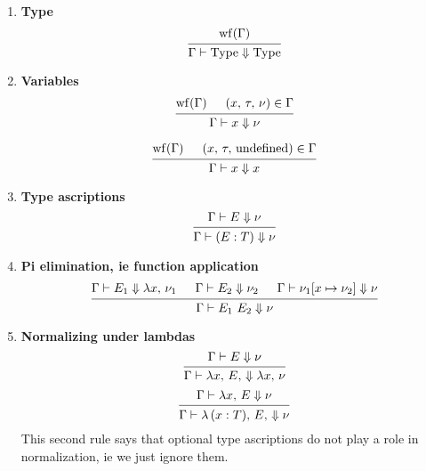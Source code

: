 \documentclass{article}
\begin{document}
\begin{enumerate}
\item \textbf{Type}
  \[
    \begin{prooftree}
      \hypo{\wf(\Gamma)}
      \infer1{\Gamma \vdash \Type \Downarrow \Type} 
    \end{prooftree}
  \]
\item \textbf{Variables} \\
  \[
    \begin{prooftree}
      \hypo{\wf(\Gamma)}
      \hypo{(x, \, \tau, \, \nu) \in \Gamma}
      \infer2{\Gamma \vdash x \Downarrow \nu}
    \end{prooftree} 
  \]

  \[
    \begin{prooftree}
      \hypo{\wf(\Gamma)}
      \hypo{(x, \, \tau, \, \text{undefined}) \in \Gamma}
      \infer2{\Gamma \vdash x \Downarrow x}
    \end{prooftree} 
  \]

\item \textbf{Type ascriptions} \\
  \[
    \begin{prooftree}
      \hypo{\Gamma \vdash E \Downarrow \nu}
      \infer1{\Gamma \vdash (E : T) \Downarrow \nu}
    \end{prooftree}
  \]
  
\item \textbf{Pi elimination, ie function application} \\
  \[
    \begin{prooftree}
      \hypo{\Gamma \vdash E_1 \Downarrow \lambda x, \, \nu_1}
      \hypo{\Gamma \vdash E_2 \Downarrow \nu_2}
      \hypo{\Gamma \vdash \nu_1[x \mapsto \nu_2] \Downarrow \nu}
      \infer3{\Gamma \vdash E_1 \,\, E_2 \Downarrow \nu}
    \end{prooftree}
  \]

\item \textbf{Normalizing under lambdas} \\
  \[
    \begin{prooftree}
      \hypo{\Gamma \vdash E \Downarrow \nu}
      \infer1{\Gamma \vdash \lambda x, \, E, \, \Downarrow \lambda x, \, \nu}
    \end{prooftree}
  \]
  \[
    \begin{prooftree}
      \hypo{\Gamma \vdash \lambda x, \, E \Downarrow \nu}
      \infer1{\Gamma \vdash \lambda \, (x : T), \, E, \, \Downarrow \nu}
    \end{prooftree}
  \]
  This second rule says that optional type ascriptions do not play a role in
  normalization, ie we just ignore them.


\end{enumerate}
\end{document}
